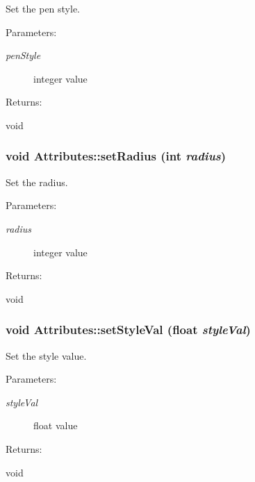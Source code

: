Set the pen style. \begin{Desc}
\item[Parameters: ]\par
\begin{description}
\item[{\em 
pen\-Style}]integer value \end{description}
\end{Desc}
\begin{Desc}
\item[Returns: ]\par
void \end{Desc}
\subsubsection{\setlength{\rightskip}{0pt plus 5cm}void Attributes::set\-Radius (int {\em radius})\hspace{0.3cm}{\tt  [inline]}}\label{classAttributes_a12}


Set the radius. \begin{Desc}
\item[Parameters: ]\par
\begin{description}
\item[{\em 
radius}]integer value \end{description}
\end{Desc}
\begin{Desc}
\item[Returns: ]\par
void \end{Desc}
\subsubsection{\setlength{\rightskip}{0pt plus 5cm}void Attributes::set\-Style\-Val (float {\em style\-Val})\hspace{0.3cm}{\tt  [inline]}}\label{classAttributes_a9}


Set the style value. \begin{Desc}
\item[Parameters: ]\par
\begin{description}
\item[{\em 
style\-Val}]float value \end{description}
\end{Desc}
\begin{Desc}
\item[Returns: ]\par
void \end{Desc}
